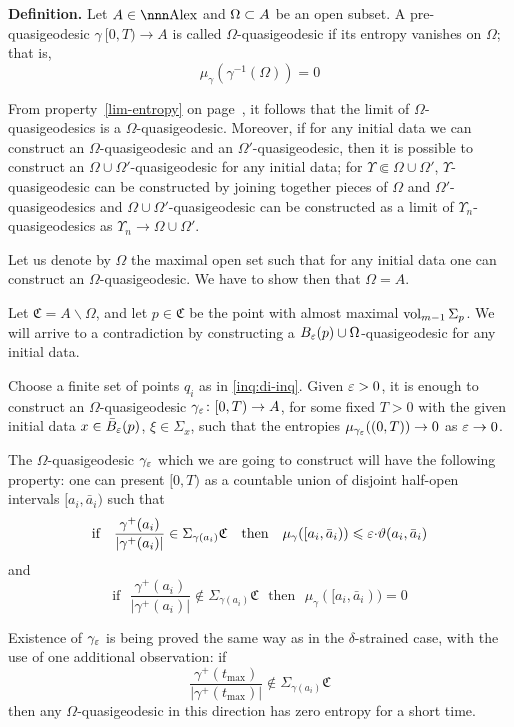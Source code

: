 \documentclass{article}
\begin{document}
\begin{thm}{\bf Definition.}
Let $A\in \Alex$ and $\Omega\subset A$ be an open subset. 
A pre-quasigeodesic $\gamma\:[0,T)\to A$ is called $\Omega$-quasigeodesic if  its
entropy vanishes on $\Omega$; 
that is, 
$$\mu_\gamma(\gamma^{-1}(\Omega))=0$$
\end{thm}

From property~\ref{lim-entropy} on page~\pageref{lim-entropy}, it follows that
the limit of $\Omega$-quasigeodesics is a $\Omega$-quasigeodesic. 
Moreover, if for any initial data we can construct an
$\Omega$-quasigeodesic and an $\Omega'$-quasigeodesic, then it is possible to construct an
$\Omega\cup \Omega'$-quasigeodesic for any initial data; for $\Upsilon\Subset\Omega\cup \Omega'$, $\Upsilon$-quasigeodesic can be constructed by joining together
pieces of $\Omega$ and $\Omega'$-quasigeodesics and $\Omega\cup \Omega'$-quasigeodesic can be constructed as a limit of $\Upsilon_n$-quasigeodesics as $\Upsilon_n\to \Omega\cup \Omega'$.

Let us denote by $\Omega$ the maximal open set such that for any initial data
one can construct an $\Omega$-quasigeodesic. 
We have to show then that $\Omega=A$. 

Let $\mathfrak C=A\backslash \Omega$, and let $p\in \mathfrak C$ be the point
with almost maximal $\operatorname{vol}_{m-1} \Sigma_p$. 
We will arrive to a contradiction by constructing  a $B_\varepsilon(p)\cup
\Omega$-quasigeodesic for any initial data. 

Choose a finite set of points $q_i$ as in \ref{inq:di-inq}.
Given $\varepsilon>0$, it is enough to construct an $\Omega$-quasigeodesic
$\gamma_\varepsilon\colon[0,T)\to A$, for some fixed $T>0$ with the given initial data $x\in
\bar B_\varepsilon(p)$, $\xi\in \Sigma_x$, such that the entropies
$\mu_{\gamma_\varepsilon}((0,T))\to 0$ as $\varepsilon\to0$.
 
The $\Omega$-quasigeodesic $\gamma_\varepsilon$ which we are going to construct will
have the following property: one can present $[0,T)$ as a countable union of disjoint
half-open intervals $[a_i,\bar a_i)$ such that 
$$\text{if}\ \ \
\frac{\gamma^+(a_i)}{|\gamma^+(a_i)|}\in \Sigma_{\gamma(a_i)}\mathfrak C \ \ \
\text{then}\ \ \   \mu_\gamma([a_i,\bar a_i))\leqslant \varepsilon{\cdot}\vartheta(a_i,\bar a_i)$$ 
and
$$\text{if}\ \ \ \frac{\gamma^+(a_i)}{|\gamma^+(a_i)|}\not\in
\Sigma_{\gamma(a_i)}\mathfrak C\ \ \ \text{then}\ \ \ \mu_\gamma([a_i,\bar a_i))=0$$

Existence of $\gamma_\varepsilon$ is being proved the same way as in the $\delta$-strained case,
with the use of one additional observation:
if $$\frac{\gamma^+(t_{\max})}{|\gamma^+(t_{\max})|}\not\in
\Sigma_{\gamma(a_i)}\mathfrak C$$ then any $\Omega$-quasigeodesic in this direction
has zero entropy for a short time.
\end{document}
